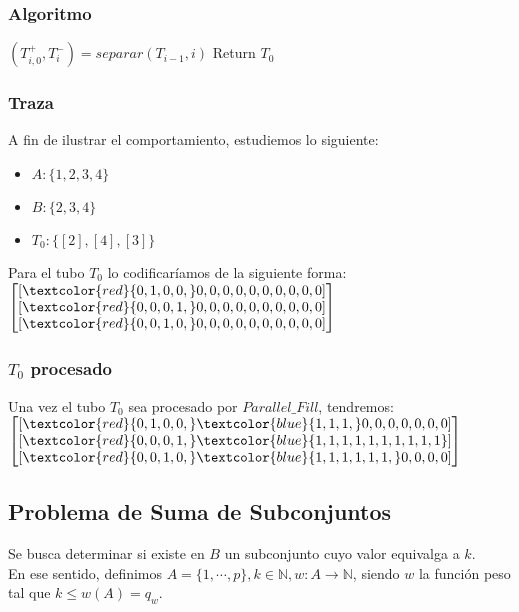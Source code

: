 \documentclass[12pt]{beamer}
\begin{document}
 \begin{frame}
     \frametitle{Algoritmo}
    \begin{algorithmic}[1]
            \State $(T^+_{i,0}, T^-_i) = separar(T_{i-1}, i)$
            \EndFor
        \EndFor
        \State Return $T_0$
        \EndProcedure
    \end{algorithmic}
 \end{frame}
 \begin{frame}
     \frametitle{Traza}
     A fin de ilustrar el comportamiento, estudiemos lo siguiente:
     \begin{itemize}
        \item $A: \{1, 2, 3, 4\}$
        \item $B: \{2, 3, 4\}$
        \item $T_0: \{[2], [4], [3]\}$
     \end{itemize}
     Para el tubo $T_0$ lo codificaríamos de la siguiente forma:
     $
        \begin{bmatrix}
        [\textcolor{red}{0, 1, 0, 0,} 0, 0, 0, 0, 0, 0, 0, 0, 0, 0] \\
        [\textcolor{red}{0, 0, 0, 1,} 0, 0, 0, 0, 0, 0, 0, 0, 0, 0] \\
        [\textcolor{red}{0, 0, 1, 0,} 0, 0, 0, 0, 0, 0, 0, 0, 0, 0]
        \end{bmatrix}
    $
 \end{frame}
 \begin{frame}
     \frametitle{$T_0$ procesado}
     Una vez el tubo $T_0$ sea procesado por $Parallel\_Fill$, tendremos: \\
    $
        \begin{bmatrix}
            [\textcolor{red}{0, 1, 0, 0,} \textcolor{blue}{1, 1, 1,} 0, 0, 0, 0, 0, 0, 0] \\
            [\textcolor{red}{0, 0, 0, 1,} \textcolor{blue}{1, 1, 1, 1, 1, 1, 1, 1, 1, 1}] \\
            [\textcolor{red}{0, 0, 1, 0,} \textcolor{blue}{1, 1, 1, 1, 1, 1,} 0, 0, 0, 0]
        \end{bmatrix}
    $
 \end{frame}
 \begin{frame}
     \section{Problema de Suma de Subconjuntos}
     Se busca determinar si existe en $B$ un subconjunto cuyo valor equivalga a $k$.\\En ese sentido, definimos $A=\{1,\cdots,p\}, k\in\mathbb{N}, w:A\rightarrow\mathbb{N}$, siendo $w$ la función peso tal que $k\leq w(A)=q_w$.
 \end{frame}
\end{document}
